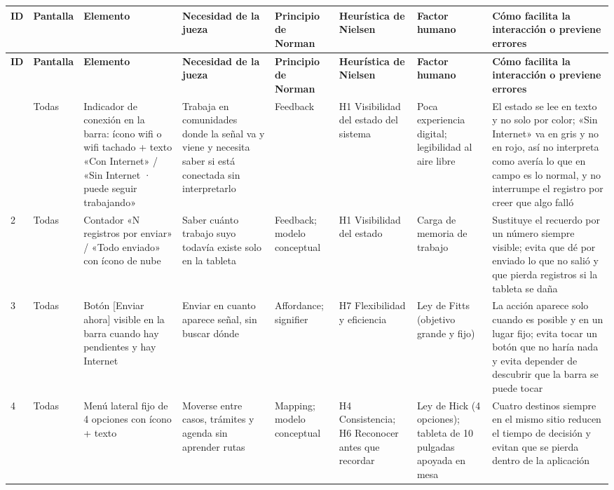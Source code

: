 \footnotesize
\setlength{\tabcolsep}{4pt}
\begin{longtable}{@{}p{0.6cm}p{1.5cm}p{3.6cm}p{3.4cm}p{2.2cm}p{2.8cm}p{2.3cm}p{4.6cm}@{}}
\toprule
\textbf{ID} & \textbf{Pantalla} & \textbf{Elemento} & \textbf{Necesidad de la jueza} & \textbf{Principio de Norman} & \textbf{Heurística de Nielsen} & \textbf{Factor humano} & \textbf{Cómo facilita la interacción o previene errores} \\
\midrule
\endfirsthead
\toprule
\textbf{ID} & \textbf{Pantalla} & \textbf{Elemento} & \textbf{Necesidad de la jueza} & \textbf{Principio de Norman} & \textbf{Heurística de Nielsen} & \textbf{Factor humano} & \textbf{Cómo facilita la interacción o previene errores} \\
\midrule
\endhead
\bottomrule
\endfoot
1 & Todas & Indicador de conexión en la barra: ícono wifi o wifi tachado + texto «Con Internet» / «Sin Internet · puede seguir trabajando» & Trabaja en comunidades donde la señal va y viene y necesita saber si está conectada sin interpretarlo & Feedback & H1 Visibilidad del estado del sistema & Poca experiencia digital; legibilidad al aire libre & El estado se lee en texto y no solo por color; «Sin Internet» va en gris y no en rojo, así no interpreta como avería lo que en campo es lo normal, y no interrumpe el registro por creer que algo falló \\
2 & Todas & Contador «N registros por enviar» / «Todo enviado» con ícono de nube & Saber cuánto trabajo suyo todavía existe solo en la tableta & Feedback; modelo conceptual & H1 Visibilidad del estado & Carga de memoria de trabajo & Sustituye el recuerdo por un número siempre visible; evita que dé por enviado lo que no salió y que pierda registros si la tableta se daña \\
3 & Todas & Botón [Enviar ahora] visible en la barra cuando hay pendientes y hay Internet & Enviar en cuanto aparece señal, sin buscar dónde & Affordance; signifier & H7 Flexibilidad y eficiencia & Ley de Fitts (objetivo grande y fijo) & La acción aparece solo cuando es posible y en un lugar fijo; evita tocar un botón que no haría nada y evita depender de descubrir que la barra se puede tocar \\
4 & Todas & Menú lateral fijo de 4 opciones con ícono + texto & Moverse entre casos, trámites y agenda sin aprender rutas & Mapping; modelo conceptual & H4 Consistencia; H6 Reconocer antes que recordar & Ley de Hick (4 opciones); tableta de 10 pulgadas apoyada en mesa & Cuatro destinos siempre en el mismo sitio reducen el tiempo de decisión y evitan que se pierda dentro de la aplicación \\

\end{longtable}
